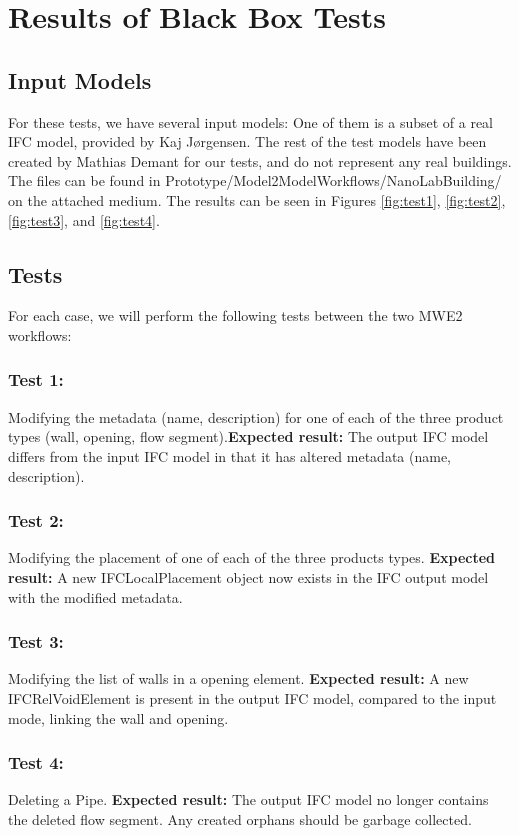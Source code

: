 \newpage
\appendix
\section{Results of Black Box Tests}
\label{app:blackboxtests}
\subsection{Input Models}
For these tests, we have several input models: One of them is a subset of a real IFC model, provided by Kaj Jørgensen. The rest of the test models have been created by Mathias Demant for our tests, and do not represent any real buildings. The files can be found in Prototype/Model2ModelWorkflows/NanoLabBuilding/ on the attached medium. The results can be seen in Figures \ref{fig:test1}, \ref{fig:test2}, \ref{fig:test3}, and \ref{fig:test4}.
\subsection{Tests}
For each case, we will perform the following tests between the two MWE2 workflows:
\subsubsection{Test 1:}
Modifying the metadata (name, description) for one of each of the three product types (wall, opening, flow segment).\newline\textbf{Expected result:} The output IFC model differs from the input IFC model in that it has altered metadata (name, description).
\subsubsection{Test 2:}
Modifying the placement of one of each of the three products types.\newline
\textbf{Expected result:} A new IFCLocalPlacement object now exists in the IFC output model with the modified metadata. 
\subsubsection{Test 3:}
Modifying the list of walls in a opening element.\newline
\textbf{Expected result:} A new IFCRelVoidElement is present in the output IFC model, compared to the input mode, linking the wall and opening.
\subsubsection{Test 4:}
Deleting a Pipe.\newline
\textbf{Expected result:} The output IFC model no longer contains the deleted flow segment. Any created orphans should be garbage collected.
